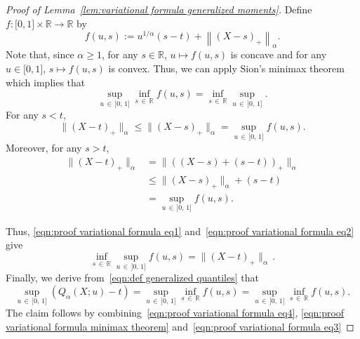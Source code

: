 \documentclass[AHL,Unicode,longabstracts,published]{cedram}
\newcommand{\bR}{\mathbb{R}}
\newcommand{\intervalleff}[2]{\mathopen{[} #1\mathclose{}\mathpunct{},#2\mathclose{]}}
\begin{document}
\begin{proof}[Proof of Lemma~\ref{lem:variational formula generalized moments}]
Define $f:\intervalleff 01\times \bR\to\bR$ by
\[
f(u,s):=u^{1/\alpha}(s-t)+\left\|(X-s)_+\right\|_\alpha.
\]
Note that, since $\alpha\geq 1$, for any $s\in\bR$, $u\mapsto f(u,s)$ is concave and for any $u\in\intervalleff 01$, $s\mapsto f(u,s)$ is convex. Thus, we can apply Sion's minimax theorem~\cite{Sion58} which implies that
\begin{equation}\label{eqn:proof variational formula minimax theorem}
\sup_{u\,\in\,]0,\,1]}\inf_{s\,\in\,\bR} f(u,s)=\inf_{s\,\in\,\bR} \sup_{u\,\in\,]0,\,1]}.
\end{equation}
For any $s<t$,
\begin{equation}\label{eqn:proof variational formula eq1}
\|(X-t)_+\|_\alpha\leq\|(X-s)_+\|_\alpha= \sup_{u\,\in\,]0,\,1]} f(u,s).
\end{equation}
Moreover, for any $s>t$,
\begin{equation}\label{eqn:proof variational formula eq2}
\begin{aligned}
\|(X-t)_+\|_\alpha &= \|((X-s)+(s-t))_+\|_\alpha\\
&\leq \|(X-s)_+\|_\alpha +(s-t)\\
&=\sup_{u\,\in\,]0,\,1]} f(u,s).
\end{aligned}
\end{equation}


Thus, \eqref{eqn:proof variational formula eq1} and~\eqref{eqn:proof variational formula eq2} give
\begin{equation}\label{eqn:proof variational formula eq3}
\inf_{s\,\in\,\bR}\sup_{u\,\in\,]0,\,1]} f(u,s)=\|(X-t)_+\|_\alpha\,.
\end{equation}
Finally, we derive from~\eqref{eqn:def generalized quantiles} that
\begin{equation}\label{eqn:proof variational formula eq4}
\sup_{u\,\in\,]0,\,1]}(Q_\alpha(X;u)-t)=\sup_{u\,\in\,]0,\,1]}\inf_{s\,\in\,\bR} f(u,s)=\sup_{u\,\in\,]0,\,1]}\inf_{s\,\in\,\bR} f(u,s).
\end{equation}
The claim follows by combining~\eqref{eqn:proof variational formula eq4}, \eqref{eqn:proof variational formula minimax theorem} and~\eqref{eqn:proof variational formula eq3}
\end{proof}
\end{document}
